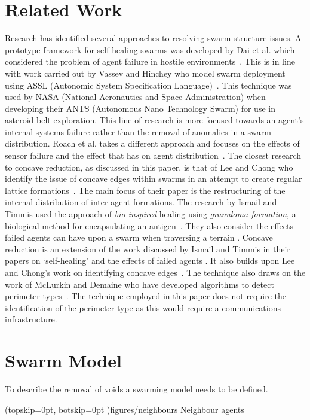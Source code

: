 \documentclass{ieeeaccess}
\begin{document}
\section{Related Work}\label{sec:RelatedWork}
Research has identified several approaches to resolving swarm structure issues. A prototype framework for self-healing swarms was developed by Dai et al. which considered the problem of agent failure in hostile environments~\cite{DHMRZ:06}. This is in line with work carried out by Vassev and Hinchey who model swarm deployment using ASSL (Autonomic System Specification Language)~\cite{VH:09}. This technique was used by NASA (National Aeronautics and Space Administration) when developing their ANTS (Autonomous Nano Technology Swarm) for use in asteroid belt exploration. This line of research is more focused towards an agent's internal systems failure rather than the removal of anomalies in a swarm distribution. Roach et al. takes a different approach and focuses on the effects of sensor failure and the effect that has on agent distribution~\cite{RMT:15}. The closest research to concave reduction, as discussed in this paper, is that of Lee and Chong who identify the issue of concave edges within swarms in an attempt to create regular lattice formations~\cite{GN:08}. The main focus of their paper is the restructuring of the internal distribution of inter-agent formations. The research by Ismail and Timmis used the approach of \textit{bio-inspired} healing using \textit{granuloma formation}, a biological method for encapsulating an antigen~\cite{IT:10}. They also consider the effects failed agents can have upon a swarm when traversing a terrain \cite{TIBW:16}. 
Concave reduction is an extension of the work discussed by Ismail and Timmis in their papers on `self-healing' \cite{IT:10} and the effects of failed agents \cite{TIBW:16}. It also builds upon Lee and Chong's work on identifying concave edges~\cite{GN:08}. The technique also draws on the work of McLurkin and Demaine who have developed algorithms to detect perimeter types~\cite{MD:09}. The technique employed in this paper does not require the identification of the perimeter type as this would require a communications infrastructure.

\section{Swarm Model}\label{sec:Swarm Model}
To describe the removal of voids a swarming model needs to be defined.

\Figure[t!](topskip=0pt, botskip=0pt ){figures/neighbours} {Neighbour agents\label{define:neighbours}}
\end{document}
